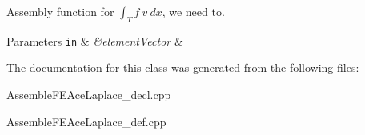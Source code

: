 Assembly function for $ \int_T f ~ v ~dx $, we need to. 


\begin{DoxyParams}[1]{Parameters}
\mbox{\tt in}  & {\em \&element\+Vector} & \\
\hline
\end{DoxyParams}


The documentation for this class was generated from the following files\+:\begin{DoxyCompactItemize}
\item 
Assemble\+F\+E\+Ace\+Laplace\+\_\+decl.\+cpp\item 
Assemble\+F\+E\+Ace\+Laplace\+\_\+def.\+cpp\end{DoxyCompactItemize}
